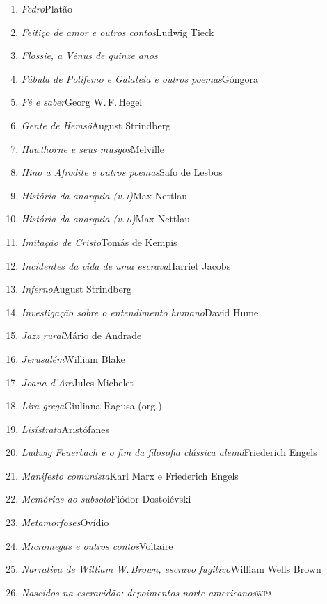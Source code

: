 \begin{enumerate}
\item \textit{Fedro}\quad Platão
\item \textit{Feitiço de amor e outros contos}\quad Ludwig Tieck
\item \textit{Flossie, a Vênus de quinze anos}\quad [Swinburne]
\item \textit{Fábula de Polifemo e Galateia e outros poemas}\quad Góngora
\item \textit{Fé e saber}\quad Georg W.\,F.\,Hegel
\item \textit{Gente de Hemsö}\quad August Strindberg 
\item \textit{Hawthorne e seus musgos}\quad Melville
\item \textit{Hino a Afrodite e outros poemas}\quad Safo de Lesbos 
\item \textit{História da anarquia (v.\,\textsc{i})}\quad Max Nettlau
\item \textit{História da anarquia (v.\,\textsc{ii})}\quad Max Nettlau
\item \textit{Imitação de Cristo}\quad Tomás de Kempis
\item \textit{Incidentes da vida de uma escrava}\quad Harriet Jacobs
\item \textit{Inferno}\quad August Strindberg
\item \textit{Investigação sobre o entendimento humano}\quad David Hume
\item \textit{Jazz rural}\quad Mário de Andrade
\item \textit{Jerusalém}\quad William Blake
\item \textit{Joana d'Arc}\quad Jules Michelet
\item \textit{Lira grega}\quad Giuliana Ragusa (org.)
\item \textit{Lisístrata}\quad Aristófanes 
\item \textit{Ludwig Feuerbach e o fim da filosofia clássica alemã}\quad Friederich Engels
\item \textit{Manifesto comunista}\quad Karl Marx e Friederich Engels
\item \textit{Memórias do subsolo}\quad Fiódor Dostoiévski
\item \textit{Metamorfoses}\quad Ovídio
\item \textit{Micromegas e outros contos}\quad Voltaire
\item \textit{Narrativa de William W.\,Brown, escravo fugitivo}\quad William Wells Brown
\item \textit{Nascidos na escravidão: depoimentos norte-americanos}\quad \textsc{wpa}

\end{enumerate}
